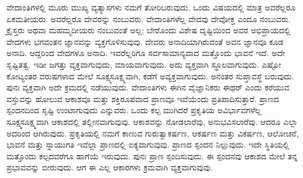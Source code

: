 ವೇದಾಂತಿಗಳಲ್ಲಿ ಮೂರು ಮುಖ್ಯ ವ್ಯತ್ಯಾಸಗಳು ನಮಗೆ ತೋರಿಬರುವುದು. ಒಂದು ವಿಷಯದಲ್ಲಿ ಮಾತ್ರ ಅವರೆಲ್ಲರೂ ಏಕಮತೀಯರು. ಅವರೆಲ್ಲರೂ ದೇವರನ್ನು ನಂಬುವರು. ವೇದಾಂತಿಗಳೆಲ್ಲ ವೇದವು ದೇವೋಕ್ತ ಎಂದೂ ನಂಬುವರು. ಕ್ರೈಸ್ತರು ಅಥವಾ ಮಹಮ್ಮದೀಯರು ನಂಬುವಂತೆ ಅಲ್ಲ; ಬೇರೊಂದು ವಿಶೇಷ ದೃಷ್ಟಿಯಿಂದ ಅವರ ಅಭಿಪ್ರಾಯದಲ್ಲಿ ವೇದಗಳು ಭಗವಂತನ ಜ್ಞಾನವನ್ನು ವ್ಯಕ್ತಗೊಳಿಸುವುವು. ದೇವರು ಅನಾದಿಯಾಗಿರುವಂತೆ ಅವನ ಜ್ಞಾನವೂ ಕೂಡ ಅನಾದಿ. ಆದ್ದರಿಂದ ವೇದಗಳೂ ಅನಾದಿ. ಇವರೆಲ್ಲರಿಗೂ ಸರ್ವಸಾಮಾನ್ಯವಾದ ಮತ್ತೊಂದು ಭಾವನೆ ಇದೆ. ಅದೇ ಸೃಷ್ಟಿತತ್ವ. ಇಡೀ ಜಗತ್ತು ವ್ಯಕ್ತವಾಗುವುದು, ಮಾಯವಾಗುವುದು. ಅದು ವ್ಯಕ್ತವಾಗಿ ಸ್ಥೂಲವಾಗುವುದು. ಎಷ್ಟೋ ಕೋಟ್ಯಂತರ ವರುಷಗಳಾದ ಮೇಲೆ ಸೂಕ್ಷ್ಮಸೂಕ್ಷ್ಮವಾಗಿ, ಕಡೆಗೆ ಅವ್ಯಕ್ತವಾಗುವುದು. ಅನಂತರ ಸುಪ್ತಾವಸ್ಥೆ ಬರುವುದು. ಪುನಃ ವ್ಯಕ್ತವಾಗಿ ಅದೇ ಕ್ರಮದಲ್ಲಿ ನಡೆಯುವುದು. ವೇದಾಂತಿಗಳು ಈಗಿನ ವೈಜ್ಞಾನಿಕರು ಈಥರ್​ ಎಂದು ಕರೆಯುವ ವಸ್ತುವನ್ನು ಹೋಲುವ ಆಕಾಶವೂ ಮತ್ತು ಶಕ್ತಿರೂಪವಾದ ಪ್ರಾಣವೂ ಇವೆಯೆಂದು ಪ್ರತಿಪಾದಿಸುತ್ತಾರೆ. ಪ್ರಾಣದ ಸ್ಪಂದನದಿಂದ ಸೃಷ್ಟಿ ಉಂಟಾಗುವುದು ಎನ್ನುವರು. ಒಂದು ಕಲ್ಪ ಮುಗಿದರೆ ಪ್ರಕೃತಿಯ ಅವಿರ್ಭಾವಗಳೆಲ್ಲ ಸೂಕ್ಷ್ಮಸೂಕ್ಷ್ಮವಾಗಿ ಆಕಾಶದಲ್ಲಿ ತಲ್ಲೀನವಾಗುವುವು. ಆಕಾಶವನ್ನು ನೋಡಲಾರೆವು, ಅನುಭವಿಸಲಾರೆವು. ಆದರೂ ಎಲ್ಲಾ ಅದರಿಂದ ಆಗಿರುವುದು. ಪ್ರಕೃತಿಯಲ್ಲಿ ನಮಗೆ ಕಾಣುವ ಗುರುತ್ವಾಕರ್ಷಣ, ಆಕರ್ಷಣ ಮತ್ತು ವಿಕರ್ಷಣ, ಆಲೋಚನೆ, ಭಾವನೆ ಮತ್ತು ಸ್ನಾಯುಗತಿ ಇವೆಲ್ಲಾ ಪ್ರಾಣದಲ್ಲಿ ಐಕ್ಯವಾಗುವುವು. ಪ್ರಾಣದ ಸ್ಪಂದನ ನಿಲ್ಲುವುದು. ಇದೇ ಸ್ಥಿತಿಯಲ್ಲಿ ಮತ್ತೊಂದು ಕಲ್ಪದವರೆಗೂ ಹಾಗೆಯೆ ಇರುವುದು. ಪುನಃ ಪ್ರಾಣ ಸ್ಪಂದಿಸುವುದು. ಈ ಸ್ಪಂದನವು ಆಕಾಶದ ಮೇಲೆ ತನ್ನ ಪ್ರಭಾವವನ್ನು ಬೀರುವುದು. ಆಗ ಈ ಎಲ್ಲ ಆಕಾರಗಳು ಕ್ರಮವಾಗಿ ವ್ಯಕ್ತವಾಗುವುವು.

